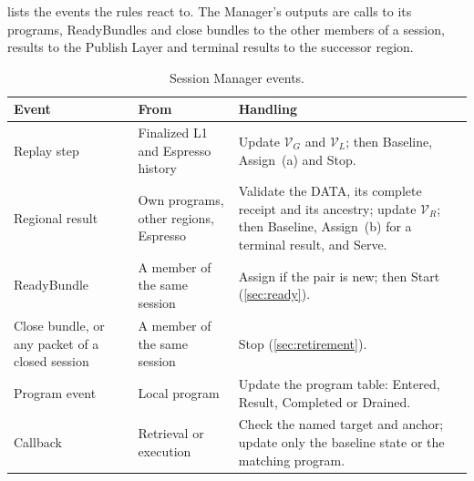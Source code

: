 \documentclass[11pt,a4paper]{article}
\begin{document}
 lists the events the rules react to. The
Manager's outputs are calls to its programs, ReadyBundles and close
bundles to the other members of a session, results to the Publish Layer
and terminal results to the successor region.

\begin{table}[htbp]\centering\small
\caption{Session Manager events.}
\label{tab:manager-inputs}
\begin{tabularx}{\linewidth}{@{}>{\raggedright\arraybackslash}p{.24\linewidth}>{\raggedright\arraybackslash}p{.24\linewidth}Y@{}}\toprule
Event & From & Handling\\\midrule
Replay step & Finalized L1 and Espresso history & Update $\mathcal V_G$ and $\mathcal V_L$;
then Baseline, Assign~(a) and Stop.\\
Regional result & Own programs, other regions, Espresso & Validate the
DATA, its complete receipt and its ancestry; update $\mathcal V_R$; then
Baseline, Assign~(b) for a terminal result, and Serve.\\
ReadyBundle & A member of the same session & Assign if the pair is new; then Start (\cref{sec:ready}).\\
Close bundle, or any packet of a closed session & A member of the same
session & Stop (\cref{sec:retirement}).\\
Program event & Local program & Update the program table: Entered,
Result, Completed or Drained.\\
Callback & Retrieval or execution & Check the named target and anchor;
update only the baseline state or the matching program.\\\bottomrule
\end{tabularx}
\end{table}
\end{document}
